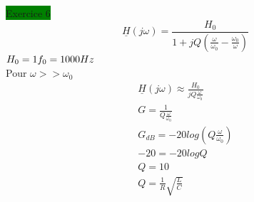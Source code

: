 \documentclass[a4paper,twocolumn,landscape]{article}
\begin{document}
\colorbox{green}{Exercice 6}\\
\begin{equation*}
    \underline{H}(j\omega) = \frac{H_0}{1+jQ(\frac{\omega}{\omega_0}-\frac{\omega_0}{\omega})}
\end{equation*}
\(H_0 = 1\\
f_0 = 1000Hz\)\\
Pour \(\omega >> \omega_0\) \begin{eqnarray*}
    \underline{H}(j\omega) \approx \frac{H_0}{jQ\frac{\omega}{\omega_0}}\\
    G = \frac{1}{Q\frac{\omega}{\omega_0}}\\
    G_{dB} = -20 log(Q\frac{\omega}{\omega_0})\\
    -20 = -20logQ\\
    Q = 10\\
    Q = \frac{1}{R}\sqrt{\frac{L}{C}}
\end{eqnarray*}
\end{document}
